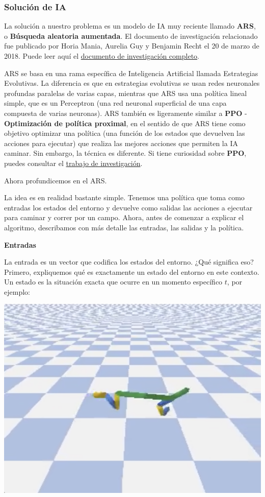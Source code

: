 \documentclass[]{book}
\begin{document}
\hypertarget{soluciuxf3n-de-ia-2}{%
\subsubsection{Solución de IA}\label{soluciuxf3n-de-ia-2}}

La solución a nuestro problema es un modelo de IA muy reciente llamado \textbf{ARS}, o \textbf{Búsqueda aleatoria aumentada}. El documento de investigación relacionado fue publicado por Horia Mania, Aurelia Guy y Benjamin Recht el 20 de marzo de 2018. Puede leer aquí el \href{https://arxiv.org/pdf/1803.07055.pdf}{documento de investigación completo}.

ARS se basa en una rama específica de Inteligencia Artificial llamada Estrategias Evolutivas. La diferencia es que en estrategias evolutivas se usan redes neuronales profundas paralelas de varias capas, mientras que ARS usa una política lineal simple, que es un Perceptron (una red neuronal superficial de una capa compuesta de varias neuronas). ARS también es ligeramente similar a \textbf{PPO} - \textbf{Optimización de política proximal}, en el sentido de que ARS tiene como objetivo optimizar una política (una función de los estados que devuelven las acciones para ejecutar) que realiza las mejores acciones que permiten la IA caminar. Sin embargo, la técnica es diferente. Si tiene curiosidad sobre \textbf{PPO}, puedes consultar el \href{https://arxiv.org/pdf/1707.06347.pdf}{trabajo de investigación}.

Ahora profundicemos en el ARS.

La idea es en realidad bastante simple. Tenemos una política que toma como entradas los estados del entorno y devuelve como salidas las acciones a ejecutar para caminar y correr por un campo. Ahora, antes de comenzar a explicar el algoritmo, describamos con más detalle las entradas, las salidas y la política.

\textbf{Entradas}

La entrada es un vector que codifica los estados del entorno. ¿Qué significa eso? Primero, expliquemos qué es exactamente un estado del entorno en este contexto. Un estado es la situación exacta que ocurre en un momento específico \(t\), por ejemplo:

\includegraphics{Images/Cheetah_in_the_air.png}
\end{document}
